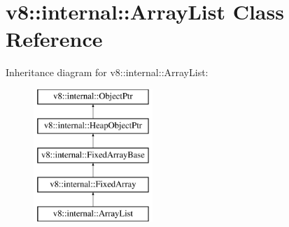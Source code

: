 \hypertarget{classv8_1_1internal_1_1ArrayList}{}\section{v8\+:\+:internal\+:\+:Array\+List Class Reference}
\label{classv8_1_1internal_1_1ArrayList}
Inheritance diagram for v8\+:\+:internal\+:\+:Array\+List\+:\begin{figure}[H]
\begin{center}
\leavevmode
\includegraphics[height=5.000000cm]{classv8_1_1internal_1_1ArrayList}
\end{center}
\end{figure}
